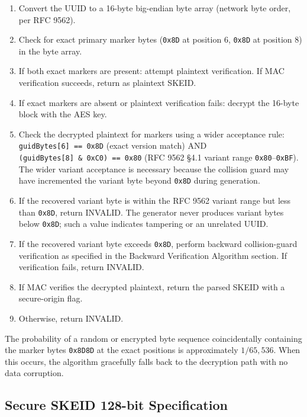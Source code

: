 \documentclass[fleqn,10pt]{wlpeerj}
\providecommand{\tightlist}{%
  \setlength{\itemsep}{0pt}\setlength{\parskip}{0pt}}
\begin{document}
\begin{enumerate}
\def\labelenumi{\arabic{enumi}.}
\tightlist
\item
  Convert the UUID to a 16-byte big-endian byte array (network byte
  order, per RFC 9562).
\item
  Check for exact primary marker bytes (\texttt{0x8D} at position 6,
  \texttt{0x8D} at position 8) in the byte array.
\item
  If both exact markers are present: attempt plaintext verification. If
  MAC verification succeeds, return as plaintext SKEID.
\item
  If exact markers are absent or plaintext verification fails: decrypt
  the 16-byte block with the AES key.
\item
  Check the decrypted plaintext for markers using a wider acceptance
  rule: \texttt{guidBytes{[}6{]}\ ==\ 0x8D} (exact version match) AND
  \texttt{(guidBytes{[}8{]}\ \&\ 0xC0)\ ==\ 0x80} (RFC 9562 §4.1 variant
  range \texttt{0x80}--\texttt{0xBF}). The wider variant acceptance is
  necessary because the collision guard may have incremented the variant
  byte beyond \texttt{0x8D} during generation.
\item
  If the recovered variant byte is within the RFC 9562 variant range but
  less than \texttt{0x8D}, return INVALID. The generator never produces
  variant bytes below \texttt{0x8D}; such a value indicates tampering or
  an unrelated UUID.
\item
  If the recovered variant byte exceeds \texttt{0x8D}, perform backward
  collision-guard verification as specified in the Backward Verification
  Algorithm section. If verification fails, return INVALID.
\item
  If MAC verifies the decrypted plaintext, return the parsed SKEID with
  a secure-origin flag.
\item
  Otherwise, return INVALID.
\end{enumerate}

The probability of a random or encrypted byte sequence coincidentally
containing the marker bytes \texttt{0x8D8D} at the exact positions is
approximately \(1/65{,}536\). When this occurs, the algorithm gracefully
falls back to the decryption path with no data corruption.

\subsection{Secure SKEID 128-bit
Specification}\label{secure-skeid-128-bit-specification}
\end{document}
